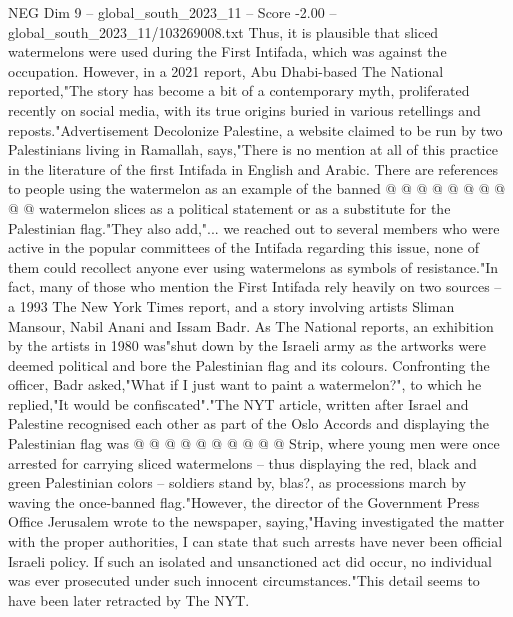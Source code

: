 \begin{textsample}{NEG Dim 9 – global\_south\_2023\_11 – Score -2.00 – global\_south\_2023\_11/103269008.txt}
Thus, it is plausible that sliced watermelons were used during the First Intifada, which was against the occupation.
However, in a 2021 report, Abu Dhabi-based The National reported,"The story has become a bit of a contemporary myth, proliferated recently on social media, with its true origins buried in various retellings and reposts."Advertisement Decolonize Palestine, a website claimed to be run by two Palestinians living in Ramallah, says,"There is no mention at all of this practice in the literature of the first Intifada in English and Arabic.
There are references to people using the watermelon as an example of the banned @ @ @ @ @ @ @ @ @ @ watermelon slices as a political statement or as a substitute for the Palestinian flag."They also add,"... we reached out to several members who were active in the popular committees of the Intifada regarding this issue, none of them could recollect anyone ever using watermelons as symbols of resistance."In fact, many of those who mention the First Intifada rely heavily on two sources -- a 1993 The New York Times report, and a story involving artists Sliman Mansour, Nabil Anani and Issam Badr.
As The National reports, an exhibition by the artists in 1980 was"shut down by the Israeli army as the artworks were deemed political and bore the Palestinian flag and its colours.
Confronting the officer, Badr asked,"What if I just want to paint a watermelon?", to which he replied,"It would be confiscated"."The NYT article, written after Israel and Palestine recognised each other as part of the Oslo Accords and displaying the Palestinian flag was @ @ @ @ @ @ @ @ @ @ Strip, where young men were once arrested for carrying sliced watermelons -- thus displaying the red, black and green Palestinian colors -- soldiers stand by, blas?, as processions march by waving the once-banned flag."However, the director of the Government Press Office Jerusalem wrote to the newspaper, saying,"Having investigated the matter with the proper authorities, I can state that such arrests have never been official Israeli policy.
If such an isolated and unsanctioned act did occur, no individual was ever prosecuted under such innocent circumstances."This detail seems to have been later retracted by The NYT.

\end{textsample}
